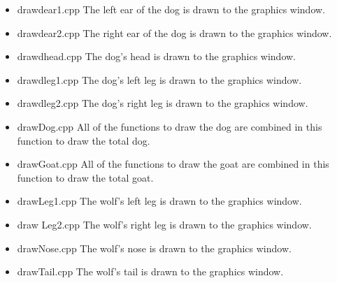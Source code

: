 \documentclass{article}
\begin{document}
\begin{itemize}
	\item drawdear1.cpp The left ear of the dog is drawn to the graphics window.
	\item drawdear2.cpp The right ear of the dog is drawn to the graphics window.
	
	\item drawdhead.cpp The dog's head is drawn to the graphics window.
	\item drawdleg1.cpp The dog's left leg is drawn to the graphics window.
	\item drawdleg2.cpp The dog's right leg is drawn to the graphics window.
	
	\item drawDog.cpp All of the functions to draw the dog are combined in this function to draw the total dog.
	
	\item drawGoat.cpp All of the functions to draw the goat are combined in this function to draw the total goat.
	\item drawLeg1.cpp  The wolf's left leg is drawn to the graphics window.
	\item draw Leg2.cpp The wolf's right leg is drawn to the graphics window.
	\item drawNose.cpp The wolf's nose is drawn to the graphics window.
	\item drawTail.cpp The wolf's tail is drawn to the graphics window.
	

\end{itemize}
\end{document}
